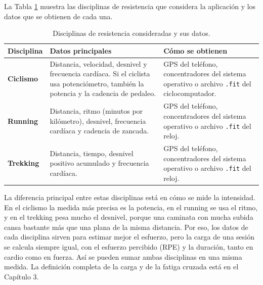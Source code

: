 La Tabla \ref{tab:tipos_cardio} muestra las disciplinas de resistencia que considera la aplicación y los datos que se obtienen de cada una.

\begin{table}[h!]
    \centering
    \renewcommand{\arraystretch}{1.4}
    \begin{tabular}{|m{2.5cm}|m{6.5cm}|m{5.5cm}|}
        \hline
        \rowcolor[HTML]{EFEFEF}
        \textbf{Disciplina} & \textbf{Datos principales} & \textbf{Cómo se obtienen} \\ \hline
        \textbf{Ciclismo} & Distancia, velocidad, desnivel y frecuencia cardíaca. Si el ciclista usa potenciómetro, también la potencia y la cadencia de pedaleo. & GPS del teléfono, concentradores del sistema operativo o archivo \texttt{.fit} del ciclocomputador. \\ \hline
        \textbf{Running} & Distancia, ritmo (minutos por kilómetro), desnivel, frecuencia cardíaca y cadencia de zancada. & GPS del teléfono, concentradores del sistema operativo o archivo \texttt{.fit} del reloj. \\ \hline
        \textbf{Trekking} & Distancia, tiempo, desnivel positivo acumulado y frecuencia cardíaca. & GPS del teléfono, concentradores del sistema operativo o archivo \texttt{.fit} del reloj. \\ \hline
    \end{tabular}
    \caption{Disciplinas de resistencia consideradas y sus datos.}
    \label{tab:tipos_cardio}
\end{table}

La diferencia principal entre estas disciplinas está en cómo se mide la intensidad. En el ciclismo la medida más precisa es la potencia, en el running se usa el ritmo, y en el trekking pesa mucho el desnivel, porque una caminata con mucha subida cansa bastante más que una plana de la misma distancia. Por eso, los datos de cada disciplina sirven para estimar mejor el esfuerzo, pero la carga de una sesión se calcula siempre igual, con el esfuerzo percibido (RPE) y la duración, tanto en cardio como en fuerza. Así se pueden sumar ambas disciplinas en una misma medida. La definición completa de la carga y de la fatiga cruzada está en el Capítulo 3.

